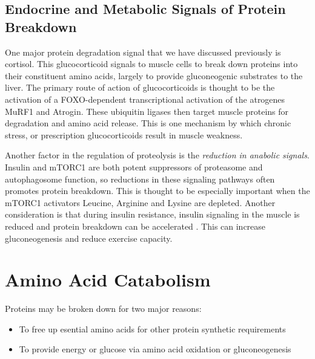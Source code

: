 \documentclass{tufte-handout}
\begin{document}
\subsection{Endocrine and Metabolic Signals of Protein Breakdown}

One major protein degradation signal that we have discussed previously is cortisol.  This glucocorticoid signals to muscle cells to break down proteins into their constituent amino acids, largely to provide gluconeogenic substrates to the liver.  The primary route of action of glucocorticoids is thought to be the activation of a FOXO-dependent transcriptional activation of the atrogenes MuRF1 and Atrogin.  These ubiquitin ligases then target muscle proteins for degradation and amino acid release.  This is one mechanism by which chronic stress, or prescription glucocorticoids result in muscle weakness.

Another factor in the regulation of proteolysis is the \emph{reduction in anabolic signals}.  Insulin and mTORC1 are both potent suppressors of proteasome and autophagosome function, so reductions in these signaling pathways often promotes protein breakdown.  This is thought to be especially important when the mTORC1 activators Leucine, Arginine and Lysine are depleted.  Another consideration is that during insulin resistance, insulin signaling in the muscle is reduced and protein breakdown can be accelerated \citep{Wang2006b}.  This can increase gluconeogenesis and reduce exercise capacity.

\section{Amino Acid Catabolism}

Proteins may be broken down for two major reasons:

\begin{itemize}
\item To free up esential amino acids for other protein synthetic requirements
\item To provide energy or glucose via amino acid oxidation or gluconeogenesis
\end{itemize}	
\end{document}
